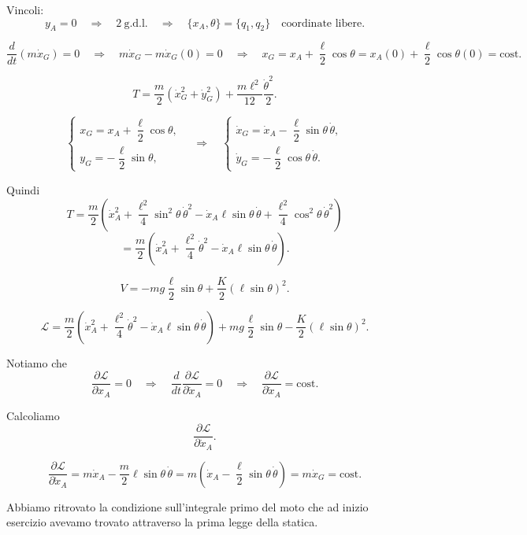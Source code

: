 \begin{example}{}
\begin{center}
\begin{tikzpicture}[scale=1, line cap=round, line join=round]
\end{tikzpicture}
    \end{center}
    Vincoli:
\[
y_A = 0
\quad \Longrightarrow \quad
2 \ \text{g.d.l.}
\quad \Longrightarrow \quad
\{x_A,\theta\}=\{q_1,q_2\}
\quad \text{coordinate libere}.
\]

\[
\frac{d}{dt}\left(m\dot{x}_G\right)=0
\quad \Longrightarrow \quad
m\dot{x}_G-m\dot{x}_G(0)=0
\quad \Longrightarrow \quad
x_G=x_A+\frac{\ell}{2}\cos\theta
=
x_A(0)+\frac{\ell}{2}\cos\theta(0)
=
\text{cost.}
\]

\[
T
=
\frac{m}{2}
\left(
\dot{x}_G^2+\dot{y}_G^2
\right)
+
\frac{m\ell^2}{12}\frac{\dot{\theta}^2}{2}.
\]

\[
\begin{cases}
x_G=x_A+\dfrac{\ell}{2}\cos\theta, \\[4pt]
y_G=-\dfrac{\ell}{2}\sin\theta,
\end{cases}
\quad \Longrightarrow \quad
\begin{cases}
\dot{x}_G=\dot{x}_A-\dfrac{\ell}{2}\sin\theta\,\dot{\theta}, \\[4pt]
\dot{y}_G=-\dfrac{\ell}{2}\cos\theta\,\dot{\theta}.
\end{cases}
\]

Quindi
\[
T
=
\frac{m}{2}
\left(
\dot{x}_A^2
+
\frac{\ell^2}{4}\sin^2\theta\,\dot{\theta}^2
-
\dot{x}_A\ell\sin\theta\,\dot{\theta}
+
\frac{\ell^2}{4}\cos^2\theta\,\dot{\theta}^2
\right)
\]
\[
=
\frac{m}{2}
\left(
\dot{x}_A^2
+
\frac{\ell^2}{4}\dot{\theta}^2
-
\dot{x}_A\ell\sin\theta\,\dot{\theta}
\right).
\]

\[
V
=
-mg\frac{\ell}{2}\sin\theta
+
\frac{K}{2}
\left(
\ell\sin\theta
\right)^2.
\]

\[
\mathcal{L}
=
\frac{m}{2}
\left(
\dot{x}_A^2
+
\frac{\ell^2}{4}\dot{\theta}^2
-
\dot{x}_A\ell\sin\theta\,\dot{\theta}
\right)
+
mg\frac{\ell}{2}\sin\theta
-
\frac{K}{2}
\left(
\ell\sin\theta
\right)^2.
\]

Notiamo che
\[
\frac{\partial \mathcal{L}}{\partial x_A}=0
\quad \Longrightarrow \quad
\frac{d}{dt}
\frac{\partial \mathcal{L}}{\partial \dot{x}_A}
=
0
\quad \Longrightarrow \quad
\frac{\partial \mathcal{L}}{\partial \dot{x}_A}
=
\text{cost.}
\]

Calcoliamo
\[
\frac{\partial \mathcal{L}}{\partial \dot{x}_A}.
\]

\[
\frac{\partial \mathcal{L}}{\partial \dot{x}_A}
=
m\dot{x}_A
-
\frac{m}{2}\ell\sin\theta\,\dot{\theta}
=
m
\left(
\dot{x}_A-\frac{\ell}{2}\sin\theta\,\dot{\theta}
\right)
=
m\dot{x}_G
=
\text{cost.}
\]

Abbiamo ritrovato la condizione sull'integrale primo del moto che ad inizio esercizio avevamo trovato attraverso la prima legge della statica.
\end{example}

